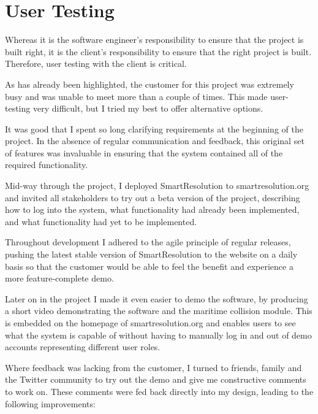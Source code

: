 \section{User Testing}

Whereas it is the software engineer's responsibility to ensure that the project is built right, it is the client's responsibility to ensure that the right project is built. Therefore, user testing with the client is critical.

As has already been highlighted, the customer for this project was extremely busy and was unable to meet more than a couple of times. This made user-testing very difficult, but I tried my best to offer alternative options.

It was good that I spent so long clarifying requirements at the beginning of the project. In the absence of regular communication and feedback, this original set of features was invaluable in ensuring that the system contained all of the required functionality.

Mid-way through the project, I deployed SmartResolution to smartresolution.org and invited all stakeholders to try out a beta version of the project, describing how to log into the system, what functionality had already been implemented, and what functionality had yet to be implemented.

Throughout development I adhered to the agile principle of regular releases, pushing the latest stable version of SmartResolution to the website on a daily basis so that the customer would be able to feel the benefit and experience a more feature-complete demo.

Later on in the project I made it even easier to demo the software, by producing a short video demonstrating the software and the maritime collision module. This is embedded on the homepage of smartresolution.org and enables users to see what the system is capable of without having to manually log in and out of demo accounts representing different user roles.

Where feedback was lacking from the customer, I turned to friends, family and the Twitter community to try out the demo and give me constructive comments to work on. These comments were fed back directly into my design, leading to the following improvements:

